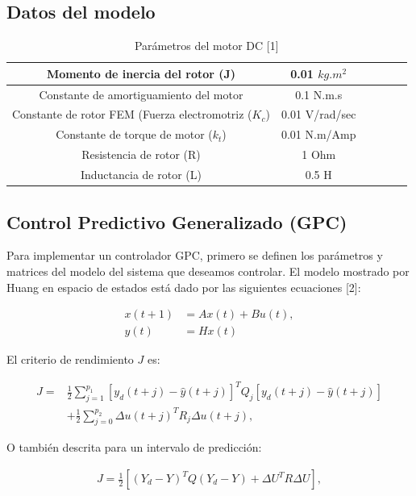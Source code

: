\documentclass[journal]{IEEEtran}
\begin{document}
\subsection{Datos del modelo}
\begin{table}[htbp]
    \centering
    \caption{Parámetros del motor DC [1]}
    \begin{tabular}{|c|c|c|c|c|c|}
        \hline
        Momento de inercia del rotor (J) & 0.01 $kg.m^2$ \\
        \hline
        Constante de amortiguamiento del motor & 0.1 N.m.s  \\
        \hline
        Constante de rotor FEM (Fuerza electromotriz ($K_c$) & 0.01 V/rad/sec  \\
        \hline
        Constante de torque de motor ($k_t$) & 0.01 N.m/Amp \\
        \hline
        Resistencia de rotor (R) & 1 Ohm \\
        \hline
         Inductancia de rotor (L) & 0.5 H \\
        \hline
    \end{tabular}
\end{table}

\subsection{Control Predictivo Generalizado (GPC)}
Para implementar un controlador GPC, primero se definen los parámetros y matrices del modelo del sistema que deseamos controlar. El modelo mostrado por Huang en espacio de estados está dado por las siguientes ecuaciones [2]:

\begin{align}
x(t + 1) &= Ax(t) + Bu(t),\label{eq:sistema1} \\
y(t) &= Hx(t) \label{eq:sistema2}
\end{align}

El criterio de rendimiento \( J \) es:


\begin{align*}
J = &\frac{1}{2} \sum_{j=1}^{p_1} [y_d(t + j) - \hat{y}(t + j)]^T Q_j [y_d(t + j) - \hat{y}(t + j)] \\
& + \frac{1}{2} \sum_{j=0}^{p_2} \Delta u(t + j)^T R_j \Delta u(t + j),
\end{align*}


O también descrita para un intervalo de predicción:

\begin{align}
J = \frac{1}{2} \left[ (Y_d - Y)^T Q (Y_d - Y) + \Delta U^T R \Delta U \right],
\end{align}
\end{document}
